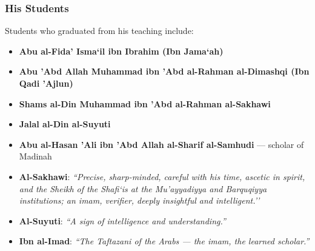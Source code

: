 \documentclass[
  a4paper,
  DIV=11,
  numbers=noendperiod]{scrartcl}
\providecommand{\tightlist}{%
  \setlength{\itemsep}{0pt}\setlength{\parskip}{0pt}}
\begin{document}
\subsubsection{His Students}\label{his-students-1}

Students who graduated from his teaching include:

\begin{itemize}
\tightlist
\item
  \textbf{Abu al-Fida' Isma`il ibn Ibrahim (Ibn Jama`ah)}\\
\item
  \textbf{Abu 'Abd Allah Muhammad ibn 'Abd al-Rahman al-Dimashqi (Ibn
  Qadi 'Ajlun)}\\
\item
  \textbf{Shams al-Din Muhammad ibn 'Abd al-Rahman al-Sakhawi}\\
\item
  \textbf{Jalal al-Din al-Suyuti}\\
\item
  \textbf{Abu al-Hasan 'Ali ibn 'Abd Allah al-Sharif al-Samhudi} ---
  scholar of Madinah
\end{itemize}

\begin{tcolorbox}[enhanced jigsaw, left=2mm, colframe=quarto-callout-note-color-frame, bottomrule=.15mm, titlerule=0mm, toprule=.15mm, opacityback=0, breakable, toptitle=1mm, colbacktitle=quarto-callout-note-color!10!white, rightrule=.15mm, title=\textcolor{quarto-callout-note-color}{\faInfo}\hspace{0.5em}{Praise from Scholars}, arc=.35mm, bottomtitle=1mm, leftrule=.75mm, opacitybacktitle=0.6, colback=white, coltitle=black]

\begin{itemize}
\tightlist
\item
  \textbf{Al-Sakhawi}: \emph{``Precise, sharp-minded, careful with his
  time, ascetic in spirit, and the Sheikh of the Shafi`is at the
  Mu'ayyadiyya and Barquqiyya institutions; an imam, verifier, deeply
  insightful and intelligent.''}\\
\item
  \textbf{Al-Suyuti}: \emph{``A sign of intelligence and
  understanding.''}\\
\item
  \textbf{Ibn al-Imad}: \emph{``The Taftazani of the Arabs --- the imam,
  the learned scholar.''}
\end{itemize}

\end{tcolorbox}
\end{document}
